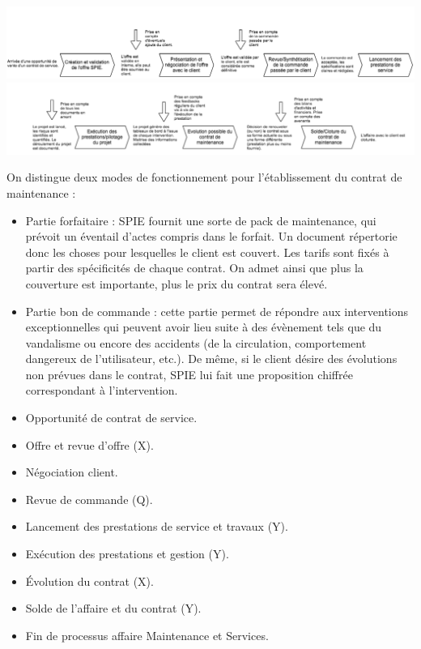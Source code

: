 \begin {center}
\includegraphics[width=\textwidth]{png_generaux/SimplificationProcessusDeMaintenanceSPIE1.png}
\includegraphics[width=\textwidth]{png_generaux/SimplificationProcessusDeMaintenanceSPIE2.png}
\end {center}

On distingue deux modes de fonctionnement pour l’établissement du contrat de maintenance :

\begin{itemize}
\item Partie forfaitaire : SPIE fournit une sorte de pack de maintenance, qui prévoit un éventail d’actes compris dans le forfait. Un document répertorie donc les choses pour lesquelles le client est couvert. Les tarifs sont fixés à partir des spécificités de chaque contrat. On admet ainsi que plus la couverture est importante, plus le prix du contrat sera élevé. 
\item Partie bon de commande : cette partie permet de répondre aux interventions exceptionnelles qui peuvent avoir lieu suite à des évènement tels que du vandalisme ou encore des accidents (de la circulation, comportement dangereux de l’utilisateur, etc.). De même, si le client désire des évolutions non prévues dans le contrat, SPIE lui fait une proposition chiffrée correspondant à l'intervention.
\end{itemize}


\begin{itemize}
\item Opportunité de contrat de service.
\item Offre et revue d’offre (X).
\item Négociation client.
\item Revue de commande (Q).
\item Lancement des prestations de service et travaux (Y).
\item Exécution des prestations et gestion (Y).%
\item Évolution du contrat (X).
\item Solde de l’affaire et du contrat (Y).
\item Fin de processus affaire Maintenance et Services.
\end{itemize}

